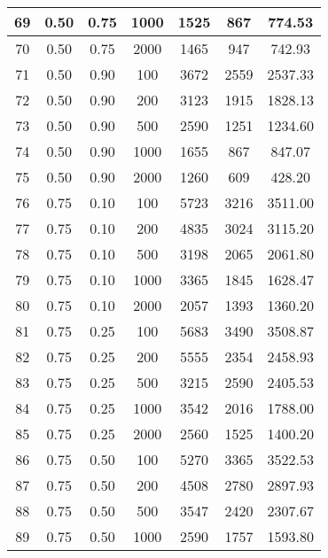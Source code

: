\documentclass[a4paper, 12pt, unknownkeysallowed]{extreport}
\begin{document}
\begin{center}
\begin{longtable}[c]{|c|c|c|c|c|c|c|}
  69 & 0.50 & 0.75 &  1000 & 1525 &  867 & 774.53 \\ \hline
  70 & 0.50 & 0.75 &  2000 & 1465 &  947 & 742.93 \\ \hline
  71 & 0.50 & 0.90 &   100 & 3672 & 2559 & 2537.33 \\ \hline
  72 & 0.50 & 0.90 &   200 & 3123 & 1915 & 1828.13 \\ \hline
  73 & 0.50 & 0.90 &   500 & 2590 & 1251 & 1234.60 \\ \hline
  74 & 0.50 & 0.90 &  1000 & 1655 &  867 & 847.07 \\ \hline
  75 & 0.50 & 0.90 &  2000 & 1260 &  609 & 428.20 \\ \hline
  76 & 0.75 & 0.10 &   100 & 5723 & 3216 & 3511.00 \\ \hline
  77 & 0.75 & 0.10 &   200 & 4835 & 3024 & 3115.20 \\ \hline
  78 & 0.75 & 0.10 &   500 & 3198 & 2065 & 2061.80 \\ \hline
  79 & 0.75 & 0.10 &  1000 & 3365 & 1845 & 1628.47 \\ \hline
  80 & 0.75 & 0.10 &  2000 & 2057 & 1393 & 1360.20 \\ \hline
  81 & 0.75 & 0.25 &   100 & 5683 & 3490 & 3508.87 \\ \hline
  82 & 0.75 & 0.25 &   200 & 5555 & 2354 & 2458.93 \\ \hline
  83 & 0.75 & 0.25 &   500 & 3215 & 2590 & 2405.53 \\ \hline
  84 & 0.75 & 0.25 &  1000 & 3542 & 2016 & 1788.00 \\ \hline
  85 & 0.75 & 0.25 &  2000 & 2560 & 1525 & 1400.20 \\ \hline
  86 & 0.75 & 0.50 &   100 & 5270 & 3365 & 3522.53 \\ \hline
  87 & 0.75 & 0.50 &   200 & 4508 & 2780 & 2897.93 \\ \hline
  88 & 0.75 & 0.50 &   500 & 3547 & 2420 & 2307.67 \\ \hline
  89 & 0.75 & 0.50 &  1000 & 2590 & 1757 & 1593.80 \\ \hline
  \end{longtable}
\end{center}
\end{document}

